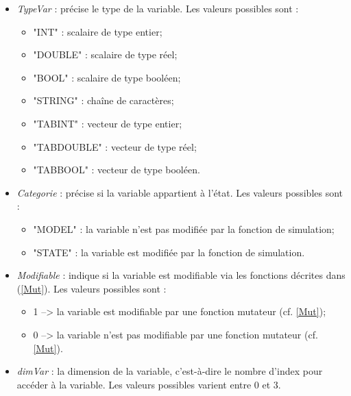 \documentclass[a4paper,11pt]{article}
\begin{document}
 \begin{itemize}
 
    \item \textit{TypeVar} : pr\'ecise le type de la variable. Les valeurs possibles sont :
            \begin{itemize}
               \item "INT" : scalaire de type entier;
               \item "DOUBLE" : scalaire de type r\'eel;
               \item "BOOL" : scalaire de type bool\'een;
               \item "STRING" : cha\^ine de caract\`eres;
               \item "TABINT" : vecteur de type entier;
               \item "TABDOUBLE" : vecteur de type r\'eel;
               \item "TABBOOL" : vecteur de type bool\'een.
            \end{itemize}
    \vspace{0.5cm}
    \item \textit{Categorie} : pr\'ecise si la variable appartient \`a l'\'etat. Les valeurs possibles sont :
            \begin{itemize}
               \item "MODEL" : la variable n'est pas modifi\'ee par la fonction de simulation;
               \item "STATE" : la variable est modifi\'ee par la fonction de simulation.
            \end{itemize}
    \vspace{0.5cm}
    \item \textit{Modifiable} : indique si la variable est modifiable via les fonctions d\'ecrites dans (\ref{Mut}). Les valeurs possibles sont :
            \begin{itemize}
               \item 1 --> la variable est modifiable par une fonction mutateur (cf. \ref{Mut});
               \item 0 --> la variable n'est pas modifiable par une fonction mutateur (cf. \ref{Mut}).
            \end{itemize}
    \vspace{0.5cm}
    \item \textit{dimVar} : la dimension de la variable, c'est-\`a-dire le nombre d'index pour acc\'eder \`a la variable. Les valeurs possibles varient entre 0 et 3.        
 \end{itemize}
 
\end{document}
